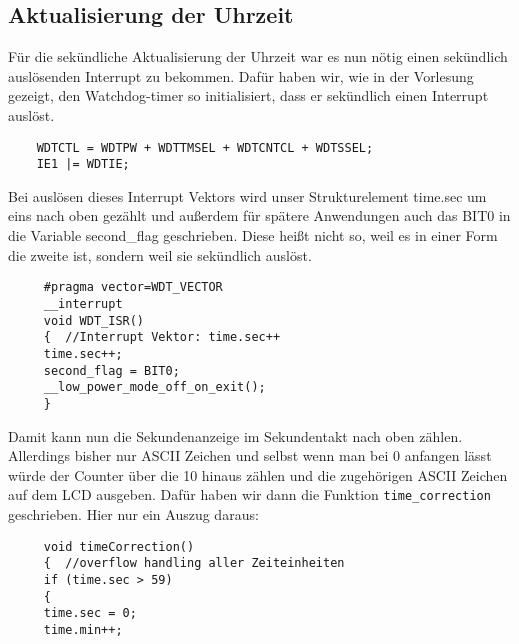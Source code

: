 \documentclass[openright,twoside,11pt,a4paper]{scrartcl}
\begin{document}
\begin{flushleft}
		\section{Aktualisierung der Uhrzeit}
		Für die sekündliche Aktualisierung der Uhrzeit war es nun nötig einen sekündlich auslösenden Interrupt zu bekommen. Dafür haben wir, wie in der Vorlesung gezeigt, den Watchdog-timer so initialisiert, dass er sekündlich einen Interrupt auslöst. 
		\begin{lstlisting}
	WDTCTL = WDTPW + WDTTMSEL + WDTCNTCL + WDTSSEL; 
	IE1 |= WDTIE; 
		\end{lstlisting}
		Bei auslösen dieses Interrupt Vektors wird unser Strukturelement time.sec um eins nach oben gezählt und außerdem für spätere Anwendungen auch das BIT0 in die Variable second\_flag geschrieben. Diese heißt nicht so, weil es in einer Form die zweite ist, sondern weil sie sekündlich auslöst.\newpage
		 \begin{lstlisting}
	 #pragma vector=WDT_VECTOR  
	 __interrupt
	 void WDT_ISR()  
	 {	//Interrupt Vektor: time.sec++
	 time.sec++;
	 second_flag = BIT0;
	 __low_power_mode_off_on_exit();
	 }
		 \end{lstlisting}
		 Damit kann nun die Sekundenanzeige im Sekundentakt nach oben zählen. Allerdings bisher nur ASCII Zeichen und selbst wenn man bei 0 anfangen lässt würde der Counter über die 10 hinaus zählen und die zugehörigen ASCII Zeichen auf dem LCD ausgeben. Dafür haben wir dann die Funktion \lstinline[language=c++]|time_correction| geschrieben. Hier nur ein Auszug daraus:
		 \begin{lstlisting}
	 void timeCorrection()    
	 {	//overflow handling aller Zeiteinheiten
	 if (time.sec > 59)
	 {
	 time.sec = 0;
	 time.min++;
	 

\end{lstlisting}
\end{flushleft}
\end{document}

